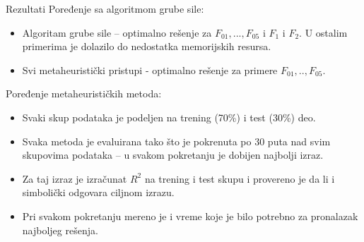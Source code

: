 \documentclass{beamer}
\begin{document}
\begin{frame}{Rezultati}
\small
Poređenje sa algoritmom grube sile:
\begin{itemize}
    \item Algoritam grube sile -- optimalno rešenje za $F_{01}, ..., F_{05}$ i $F_{1}$ i $F_{2}$. U ostalim primerima je dolazilo do nedostatka memorijskih resursa.
    \item Svi metaheuristički pristupi - optimalno rešenje za primere $F_{01},.., F_{05}$.
\end{itemize}
Poređenje metaheurističkih metoda:
\begin{itemize}
    \item Svaki skup podataka je podeljen na trening (70\%) i test (30\%) deo.
    \item Svaka metoda je evaluirana tako što je pokrenuta po 30 puta nad svim skupovima podataka -- u svakom pokretanju je dobijen najbolji izraz.
    \item Za taj izraz je izračunat $R^2$ na trening i test skupu i provereno je da li i simbolički odgovara ciljnom izrazu.
    \item Pri svakom pokretanju mereno je i vreme koje je bilo potrebno za pronalazak najboljeg rešenja.
\end{itemize}
\end{frame}


\end{document}
